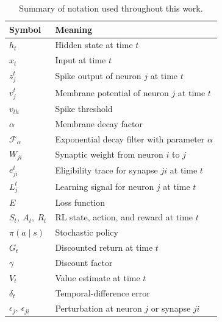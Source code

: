 \begin{table}[h]
\centering
\begin{tabular}{ll}
\toprule
\textbf{Symbol} & \textbf{Meaning} \\
\midrule
$h_t$                       & Hidden state at time $t$ \\
$x_t$                       & Input at time $t$ \\
$z^t_j$                     & Spike output of neuron $j$ at time $t$ \\
$v^t_j$                     & Membrane potential of neuron $j$ at time $t$ \\
$v_{th}$                    & Spike threshold \\
$\alpha$                    & Membrane decay factor \\
$\mathcal{F}_\alpha$        & Exponential decay filter with parameter $\alpha$ \\
$W_{ji}$                    & Synaptic weight from neuron $i$ to $j$ \\
$e^t_{ji}$                  & Eligibility trace for synapse $ji$ at time $t$ \\
$L^t_j$                     & Learning signal for neuron $j$ at time $t$ \\
$E$                         & Loss function \\
$S_t,\ A_t,\ R_t$           & RL state, action, and reward at time $t$ \\
$\pi(a \mid s)$             & Stochastic policy \\
$G_t$                       & Discounted return at time $t$ \\
$\gamma$                    & Discount factor \\
$V_t$                       & Value estimate at time $t$ \\
$\delta_t$                  & Temporal-difference error \\
$\epsilon_j,\ \epsilon_{ji}$& Perturbation at neuron $j$ or synapse $ji$ \\
\bottomrule
\end{tabular}
\caption{Summary of notation used throughout this work.}
\end{table}
